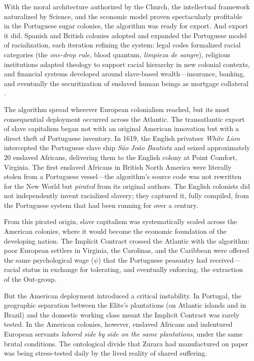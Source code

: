 \documentclass[12pt,openany]{book}
\begin{document}
With the moral architecture authorized by the Church, the intellectual framework naturalized by Science, and the economic model proven spectacularly profitable in the Portuguese sugar colonies, the algorithm was ready for export. And export it did. Spanish and British colonies adopted and expanded the Portuguese model of racialization, each iteration refining the system: legal codes formalized racial categories (the \textit{one-drop rule}, blood quantum, \textit{limpieza de sangre}), religious institutions adapted theology to support racial hierarchy in new colonial contexts, and financial systems developed around slave-based wealth---insurance, banking, and eventually the securitization of enslaved human beings as mortgage collateral \cite{beckert, johnson}.

The algorithm spread wherever European colonialism reached, but its most consequential deployment occurred across the Atlantic. The transatlantic export of slave capitalism began not with an original American innovation but with a direct theft of Portuguese inventory. In 1619, the English privateer \textit{White Lion} intercepted the Portuguese slave ship \textit{S\~{a}o Jo\~{a}o Bautista} and seized approximately 20 enslaved Africans, delivering them to the English colony at Point Comfort, Virginia. The first enslaved Africans in British North America were literally stolen from a Portuguese vessel---the algorithm's source code was not rewritten for the New World but \textit{pirated} from its original authors. The English colonists did not independently invent racialized slavery; they captured it, fully compiled, from the Portuguese system that had been running for over a century.

From this pirated origin, slave capitalism was systematically scaled across the American colonies, where it would become the economic foundation of the developing nation. The Implicit Contract crossed the Atlantic with the algorithm: poor European settlers in Virginia, the Carolinas, and the Caribbean were offered the same psychological wage ($\psi$) that the Portuguese peasantry had received---racial status in exchange for tolerating, and eventually enforcing, the extraction of the Out-group.

But the American deployment introduced a critical instability. In Portugal, the geographic separation between the Elite's plantations (on Atlantic islands and in Brazil) and the domestic working class meant the Implicit Contract was rarely tested. In the American colonies, however, enslaved Africans and indentured European servants \textit{labored side by side on the same plantations}, under the same brutal conditions. The ontological divide that Zurara had manufactured on paper was being stress-tested daily by the lived reality of shared suffering.
\end{document}
